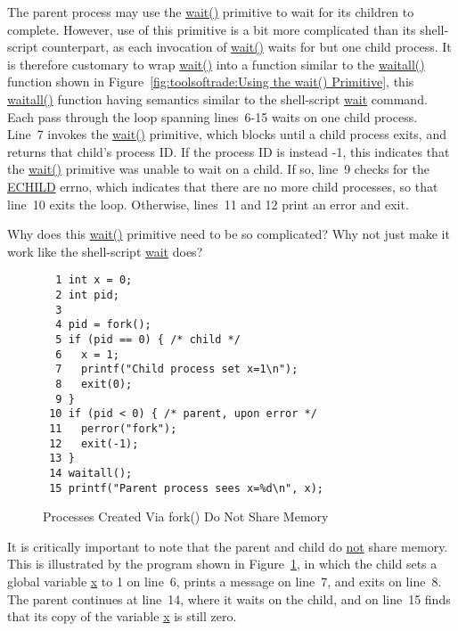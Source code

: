 The parent process may use the \url{wait()} primitive to wait for its children
to complete.
However, use of this primitive is a bit more complicated than its shell-script
counterpart, as each invocation of \url{wait()} waits for but one child
process.
It is therefore customary to wrap \url{wait()} into a function similar
to the \url{waitall()} function shown in
Figure~\ref{fig:toolsoftrade:Using the wait() Primitive},
this \url{waitall()} function having semantics similar to the
shell-script \url{wait} command.
Each pass through the loop spanning lines~6-15 waits on one child process.
Line~7 invokes the \url{wait()} primitive, which blocks until a child process
exits, and returns that child's process ID.
If the process ID is instead -1, this indicates that the \url{wait()}
primitive was unable to wait on a child.
If so, line~9 checks for the \url{ECHILD} errno, which indicates that there
are no more child processes, so that line~10 exits the loop.
Otherwise, lines~11 and 12 print an error and exit.

\QuickQuiz{}
	Why does this \url{wait()} primitive need to be so complicated?
	Why not just make it work like the shell-script \url{wait} does?
 \QuickQuizEnd

\begin{figure}[tbp]
{ \scriptsize
\begin{verbatim}
  1 int x = 0;
  2 int pid;
  3 
  4 pid = fork();
  5 if (pid == 0) { /* child */
  6   x = 1;
  7   printf("Child process set x=1\n");
  8   exit(0);
  9 }
 10 if (pid < 0) { /* parent, upon error */
 11   perror("fork");
 12   exit(-1);
 13 }
 14 waitall();
 15 printf("Parent process sees x=%d\n", x);
\end{verbatim}
}
\caption{Processes Created Via fork() Do Not Share Memory}
\label{fig:toolsoftrade:Processes Created Via fork() Do Not Share Memory}
\end{figure}

It is critically important to note that the parent and child do \url{not}
share memory.
This is illustrated by the program shown in
Figure~\ref{fig:toolsoftrade:Processes Created Via fork() Do Not Share Memory},
in which the child sets a global variable \url{x} to 1 on line~6,
prints a message on line~7, and exits on line~8.
The parent continues at line~14, where it waits on the child,
and on line~15 finds that its copy of the variable \url{x} is still zero.

